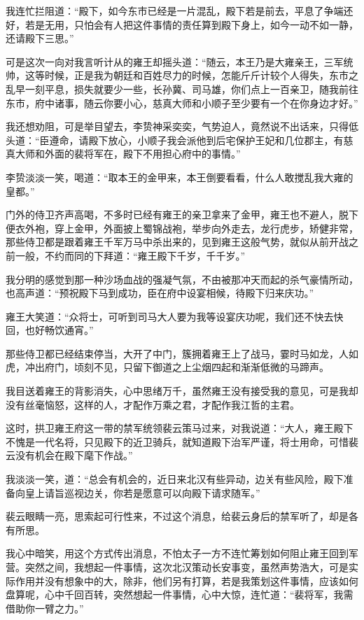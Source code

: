 我连忙拦阻道：“殿下，如今东市已经是一片混乱，殿下若是前去，平息了争端还好，若是无用，只怕会有人把这件事情的责任算到殿下身上，如今一动不如一静，还请殿下三思。”

可是这次一向对我言听计从的雍王却摇头道：“随云，本王乃是大雍亲王，三军统帅，这等时候，正是我为朝廷和百姓尽力的时候，怎能斤斤计较个人得失，东市之乱早一刻平息，损失就要少一些，长孙冀、司马雄，你们点上一百亲卫，随我前往东市，府中诸事，随云你要小心，慈真大师和小顺子至少要有一个在你身边才好。”

我还想劝阻，可是举目望去，李贽神采奕奕，气势迫人，竟然说不出话来，只得低头道：“臣遵命，请殿下放心，小顺子我会派他到后宅保护王妃和几位郡主，有慈真大师和外面的裴将军在，殿下不用担心府中的事情。”

李贽淡淡一笑，喝道：“取本王的金甲来，本王倒要看看，什么人敢搅乱我大雍的皇都。”

门外的侍卫齐声高喝，不多时已经有雍王的亲卫拿来了金甲，雍王也不避人，脱下便衣外袍，穿上金甲，外面披上蜀锦战袍，举步向外走去，龙行虎步，矫健非常，那些侍卫都是跟着雍王千军万马中杀出来的，见到雍王这般气势，就似从前开战之前一般，不约而同的下拜道：“雍王殿下千岁，千千岁。”

我分明的感觉到那一种沙场血战的强凝气氛，不由被那冲天而起的杀气豪情所动，也高声道：“预祝殿下马到成功，臣在府中设宴相候，待殿下归来庆功。”

雍王大笑道：“众将士，可听到司马大人要为我等设宴庆功呢，我们还不快去快回，也好畅饮通宵。”

那些侍卫都已经结束停当，大开了中门，簇拥着雍王上了战马，霎时马如龙，人如虎，冲出府门，顷刻不见，只留下御道之上尘烟四起和渐渐低微的马蹄声。

我目送着雍王的背影消失，心中思绪万千，虽然雍王没有接受我的意见，可是我却没有丝毫恼怒，这样的人，才配作万乘之君，才配作我江哲的主君。

这时，拱卫雍王府这一带的禁军统领裴云策马过来，对我说道：“大人，雍王殿下不愧是一代名将，只见殿下的近卫骑兵，就知道殿下治军严谨，将士用命，可惜裴云没有机会在殿下麾下作战。”

我淡淡一笑，道：“总会有机会的，近日来北汉有些异动，边关有些风险，殿下准备向皇上请旨巡视边关，你若是愿意可以向殿下请求随军。”

裴云眼睛一亮，思索起可行性来，不过这个消息，给裴云身后的禁军听了，却是各有所思。

我心中暗笑，用这个方式传出消息，不怕太子一方不连忙筹划如何阻止雍王回到军营。突然之间，我想起一件事情，这次北汉策动长安事变，虽然声势浩大，可是实际作用并没有想象中的大，除非，他们另有打算，若是我策划这件事情，应该如何盘算呢，心中千回百转，突然想起一件事情，心中大惊，连忙道：“裴将军，我需借助你一臂之力。”

